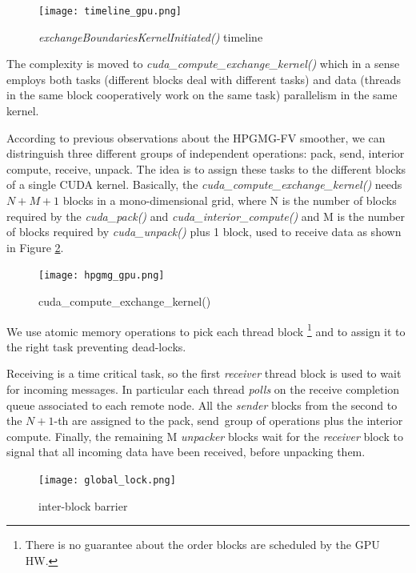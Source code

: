\documentclass[review]{siamart1116}
\begin{document}
\begin{figure}[h]
\centering
\texttt{[image: timeline\_gpu.png]}
\caption{\textit{exchangeBoundariesKernelInitiated()} timeline}
\label{fig:gpu_initiated_timeline}
\end{figure}


The complexity is moved to \textit{cuda\_compute\_exchange\_kernel()} which
in a sense employs both tasks (different blocks deal with different tasks)
and data (threads in the same block cooperatively work on the same task)
parallelism in the same kernel.

According to previous observations about the HPGMG-FV smoother, we can
distringuish three different groups of independent operations:
\lbrack pack, send\rbrack,
\lbrack interior compute\rbrack,
\lbrack receive, unpack\rbrack.
%
The idea is to assign these tasks to the different blocks of a single CUDA
kernel.
%
Basically, the \textit{cuda\_compute\_exchange\_kernel()} needs $N+M+1$
blocks in a mono-dimensional grid, where N is the number of blocks required
by the \textit{cuda\_pack()} and \textit{cuda\_interior\_compute()} and M
is the number of blocks required by \textit{cuda\_unpack()} plus 1 block,
used to receive data as shown in Figure \ref{fig:gpu_initited}.
%

\begin{figure}[h]
\centering
\texttt{[image: hpgmg\_gpu.png]}
\caption{cuda\_compute\_exchange\_kernel()}
\label{fig:gpu_initited}
\end{figure}


We use atomic memory operations to pick each thread block
\footnote{There is no guarantee about the order blocks are scheduled by the
  GPU HW.} and to assign it to the right task preventing
dead-locks.

Receiving is a time critical task, so the first \textit{receiver} thread
block is used to wait for incoming messages. In particular each thread
\textit{polls} on the receive completion queue associated to each remote
node.
%
All the \textit{sender} blocks from the second to the $N+1$-th are assigned
to the \lbrack pack, send\rbrack~group of operations plus the \lbrack
interior compute\rbrack.
%
Finally, the remaining M \textit{unpacker} blocks wait for the
\textit{receiver} block to signal that all incoming data have been received,
before unpacking them.


\begin{figure}[h]
\centering
\texttt{[image: global\_lock.png]}
\caption{inter-block barrier}
\label{fig:global_lock}
\end{figure}
\end{document}
